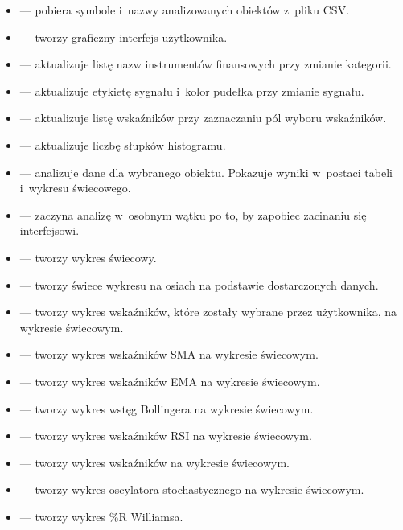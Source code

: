 \documentclass[12pt]{article}
\begin{document}
	\begin{itemize}
        \item {} — pobiera symbole i~nazwy analizowanych obiektów z~pliku CSV\@.
        \item {} — tworzy graficzny interfejs użytkownika.
        \item {} — aktualizuje listę nazw instrumentów finansowych przy zmianie kategorii.
        \item {} — aktualizuje etykietę sygnału i~kolor pudełka przy zmianie sygnału.
        \item {} — aktualizuje listę wskaźników przy zaznaczaniu pól wyboru wskaźników.
        \item {} — aktualizuje liczbę słupków histogramu.
        \item {} — analizuje dane dla wybranego obiektu.
        Pokazuje wyniki w~postaci tabeli i~wykresu świecowego.
        \item {} — zaczyna analizę w~osobnym wątku po to, by zapobiec zacinaniu się interfejsowi.
        \item {} — tworzy wykres świecowy.
        \item {} — tworzy świece wykresu na osiach na podstawie dostarczonych danych.
        \item {} — tworzy wykres wskaźników, które zostały wybrane przez użytkownika,
		na wykresie świecowym.
        \item {} — tworzy wykres wskaźników SMA na wykresie świecowym.
        \item {} — tworzy wykres wskaźników EMA na wykresie świecowym.
        \item {} — tworzy wykres wstęg Bollingera na wykresie świecowym.
        \item {} — tworzy wykres wskaźników RSI na wykresie świecowym.
        \item {} — tworzy wykres wskaźników na wykresie świecowym.
        \item {} — tworzy wykres oscylatora stochastycznego na wykresie świecowym.
        \item {} — tworzy wykres \%R Williamsa.
    \end{itemize}
\end{document}
